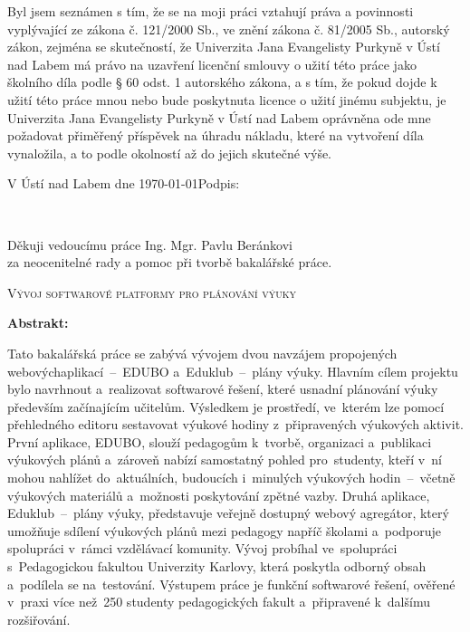 \documentclass[male,czech,api_bc]{kitheses}
\newcommand{\nazevcz}{Vývoj softwarové platformy pro plánování výuky}        %
\newcommand{\vedouciDAT}{Ing. Mgr. Pavlu Beránkovi}
\begin{document}
\vspace{0.5em}

Byl jsem seznámen 
s tím, že se na moji práci vztahují práva a povinnosti vyplývající ze
zákona č. 121/2000 Sb., ve znění zákona č. 81/2005 Sb., autorský zákon, zejména se
skutečností, že Univerzita Jana Evangelisty Purkyně v Ústí nad Labem má právo na uzavření
licenční smlouvy o užití této práce jako školního díla podle § 60 odst. 1 autorského zákona, a
s tím, že pokud dojde k užití této práce mnou nebo bude poskytnuta licence o užití jinému
subjektu, je Univerzita Jana Evangelisty Purkyně v Ústí nad Labem oprávněna ode mne
požadovat přiměřený příspěvek na úhradu nákladu, které na vytvoření díla vynaložila, a to
podle okolností až do jejich skutečné výše.

\vspace{2em}

V Ústí nad Labem dne \today   \hfill Podpis: \makebox[4cm][s]{\dotfill}

\cleardoublepage
\thispagestyle{empty}
~
\vfill

\begin{flushright}
    Děkuji vedoucímu práce {\vedouciDAT}\\ 
    za neocenitelné rady a pomoc při tvorbě bakalářské práce.
\end{flushright}

\cleardoublepage

\textsc{\nazevcz}

\textbf{Abstrakt:}

Tato bakalářská práce se zabývá vývojem dvou navzájem propojených webových\break aplikací~--~EDUBO a~Eduklub~--~plány výuky. Hlavním cílem projektu bylo navrhnout a~realizovat softwarové řešení, které usnadní plánování výuky především začínajícím učitelům. Výsledkem je prostředí, ve~kterém lze pomocí přehledného editoru sestavovat výukové hodiny z~připravených výukových aktivit. První aplikace, EDUBO, slouží pedagogům k~tvorbě, organizaci a~publikaci výukových plánů a~zároveň nabízí samostatný pohled pro~studenty, kteří v~ní mohou nahlížet do~aktuálních, budoucích i~minulých výukových hodin~--~včetně výukových materiálů a~možnosti poskytování zpětné vazby. Druhá aplikace, Eduklub~--~plány výuky, představuje veřejně dostupný webový agregátor, který umožňuje sdílení výukových plánů mezi pedagogy napříč školami a~podporuje spolupráci v~rámci vzdělávací komunity. Vývoj probíhal ve~spolupráci s~Pedagogickou fakultou Univerzity Karlovy, která poskytla odborný obsah a~podílela se na~testování. Výstupem práce je funkční softwarové řešení, ověřené v~praxi více než~250 studenty pedagogických fakult a~připravené k~dalšímu rozšiřování.
\end{document}
